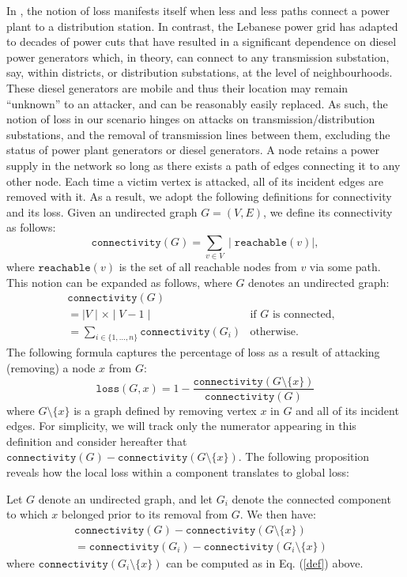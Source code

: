 In \cite{2000Natur.406..378A}, the notion of loss manifests itself when less and less paths connect a power plant to a distribution station. In contrast, the Lebanese power grid has adapted to decades of power cuts that have resulted in a significant dependence on diesel power generators which, in theory, can connect to any transmission substation, say, within districts, or distribution substations, at the level of neighbourhoods. These diesel generators are mobile and thus their location may remain ``unknown'' to an attacker, and can be reasonably easily replaced. As such, the notion of loss in our scenario hinges on attacks on transmission/distribution substations, and the removal of transmission lines between them, excluding the status of power plant generators or diesel generators. A node retains a power supply in the network so long as there exists a path of edges connecting it to any other node. Each time a victim vertex is attacked, all of its incident edges are removed with it. As a result, we adopt the following definitions for connectivity and its loss. Given an undirected graph $G=(V,E)$, we define its connectivity as follows:
$$
\mathtt{connectivity}(G) = \sum_{v \in V} \mid \mathtt{reachable}(v) \mid,
$$
where $\mathtt{reachable}(v)$ is the set of all reachable nodes from $v$ via some path. 
This notion can be expanded as follows, where $G$ denotes an undirected graph:
\begin{equation}
\begin{array}{llr}
\mathtt{connectivity}(G) && \\
=  \mid V \mid \times \mid V-1 \mid & \mbox{if $G$ is connected,}& \\
 =  \sum_{i \in \{1,\ldots,n\}} \mathtt{connectivity}(G_i) & \mbox{otherwise.}&
\end{array}
\label{def}
\end{equation}
The following formula captures the percentage of loss as a result of attacking (removing) a node $x$ from $G$:
$$
\mathtt{loss}(G, x) = 1 - \frac{\mathtt{connectivity}(G \setminus \{x\})}{\mathtt{connectivity}(G)}
$$
where $G \setminus \{x\}$ is a graph defined by removing vertex $x$ in $G$ and all of its incident edges. For simplicity, we will track only the numerator appearing in this definition and consider hereafter that $\mathtt{connectivity}(G)-\mathtt{connectivity}(G \setminus \{x\})$. The following proposition reveals how the local loss within a component translates to global loss:
\begin{proposition}
Let $G$ denote an undirected graph, and let $G_i$ denote the connected component to which $x$ belonged prior to its removal from $G$. We then have:
\begin{equation}
\begin{array}{ll}
\mathtt{connectivity}(G) - \mathtt{connectivity}(G \setminus \{x\}) &\\
= \mathtt{connectivity}(G_i) - \mathtt{connectivity}(G_i \setminus \{x\})
\end{array}
\label{loss}
\end{equation}
where $\mathtt{connectivity}(G_i \setminus \{x\})$ can be computed as in Eq. (\ref{def}) above.
\label{connectivity}
\end{proposition}
